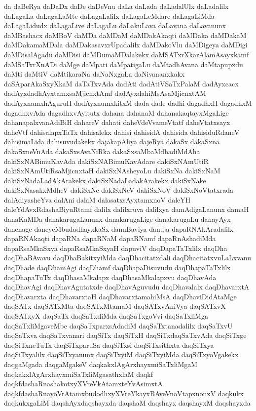 {da
daBeRya
daDaDx
daDe
daDeVnu
daLa
daLada
daLadalUlx
daLadalilx
daLagaLa
daLagaLaMte
daLagaLalilx
daLagaLeMdare
daLagaLiMda
daLagaLidudx
daLagaLive
daLagaLu
daLakuLava
daLavana
daLavanunx
daMBashacx
daMBoV
daMDa
daMDaM
daMDakAkaqti
daMDaka
daMDakaM
daMDakamaMDala
daMDakasavxrUpadalilx
daMDakoVlu
daMDigeya
daMDigi
daMDisalAgadu
daMDisi
daMDumaMDalakekx
daMSATxrXkarAlamAsayxkamf
daMSaTxrXnADi
daMge
daMpati
daMpatigaLu
daMtadhAvana
daMtapupxdu
daMti
daMtiV
daMtikaraNa
daNaNxgaLa
daNivananxkakx
daSAparAkaSxyXkaM
daTaTxvAda
dadAti
dadAtiVSaTxPalaM
dadAyxcacx
dadAyxdadhAyxtamxsaMjicnxtAmf
dadAyxdahiMsAsaMjicnxtAM
dadAyxnamxhAguruH
dadAyxnumxkitxM
dada
dade
dadhi
dagadhxH
dagadhxM
dagadhxvAda
dagadhxvAyitutx
dahana
dahanaM
dahanakaqtayxMgaLige
dahanapalxvanAdiBiH
dahareV
dahati
daheVdeVvameVtatf
daheVtatxsayx
daheVtf
dahisalapxTaTx
dahisalekx
dahisi
dahisidA
dahisida
dahisiduRdaneV
dahisimaLida
dahisuvudakekx
dajakapAliya
dajeRya
dakaSx
dakaSxna
dakaSxneVnAda
dakaSxsAvaNiRka
dakaSxsaMbaMdhadiMdAha
dakiSxNABimuKavAda
dakiSxNABimuKavAdare
dakiSxNAmUtiR
dakiSxNAmUtiRsaMjicnxtaH
dakiSxNAsheyoLu
dakiSxNa
dakiSxNaM
dakiSxNadaLadAkArakekx
dakiSxNadaLadakArakekx
dakiSxNake
dakiSxNasakxMdheV
dakiSxNe
dakiSxNeV
dakiSxNoV
dakiSxNoVtatxrada
dalAdiyasheYva
dalAni
dalaM
dalasatxsAyxtamxnoV
daleYH
daleYdAvxRdashaBiyuRtamf
dalilx
dalilxruva
dalilxya
damAdigaLanunx
damaH
danaKaMDa
danakarugaLanunx
danakarugaLige
danakarugaLu
danayAyx
danenage
daneyeMbudadhayxkaSx
danuBaviya
danuja
dapaRNAkAradalilx
dapaRNAkaqti
dapaRNa
dapaRNaM
dapaRNamf
dapaRnAshadiMda
dapaRsaMkaSxya
dapaRsaMkaSxyaH
dapuviV
daqDapaTaTxlilx
daqDha
daqDhaBAvavu
daqDhaBakitxyiMda
daqDhacitatxdali
daqDhacitatxvuLaLxvanu
daqDhade
daqDhamAgi
daqDhamf
daqDhapaDisuvudu
daqDhapaTaTxlilx
daqDhapaTuTx
daqDhasaMkalapx
daqDhasaMkalapxvu
daqDhavAda
daqDhavAgi
daqDhavAgutatxde
daqDhavAguvudu
daqDhavalalx
daqDhavarxtA
daqDhavarxta
daqDhavarxtaH
daqDhavarxtamahiMsA
daqDhaviDidAtaMge
daqSATx
daqSATxMta
daqSATxMtamaM
daqSATxvAniVya
daqSATxvX
daqSATxyX
daqSaTx
daqSaTxdiMda
daqSaTxgoVvi
daqSaTxliMga
daqSaTxliMgaveMbe
daqSaTxparxsAdadiM
daqSaTxtanadalilx
daqSaTxvU
daqSaTxva
daqSaTxvanari
daqSiTx
daqSiTxH
daqSiTxdaqSaTxvAda
daqSiTxge
daqSiTxneTuTx
daqSiTxparuSa
daqSiTxsi
daqSiTxsithxta
daqSiTxya
daqSiTxyalilx
daqSiTxyanunx
daqSiTxyiM
daqSiTxyiMda
daqSiTxyoVgakekx
daqgaMgada
daqgaMgakeV
daqkakxlAgArxhayxmiSaTxliMgaM
daqkakxlAgArxhayxmiSaTxliMgasathxlaM
daqkf
daqkfdashaRnashakotxyXVreVkAtamxteYvAsimxtA
daqkfdashaRnayoVrAtamxbudodhxyXVreYkayxBAveVnoVtapxnonxV
daqkukx
daqkukxgaLiM
daqshAyxdaqshayxda
daqshaM
daqshayx
daqshayxM
daqshayxda
}
